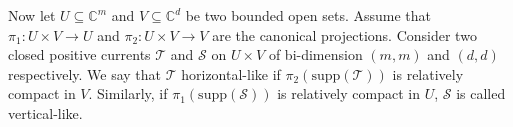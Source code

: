\documentclass[11pt]{amsart}
\theoremstyle{definition}
\newtheorem{theorem}{Theorem}[section]
\newcommand{\lto}{\longrightarrow}
\newcommand{\lmto}{\longmapsto}
\newcommand{\C}{\mathbb{C}}
\newcommand{\sT}{\mathscr{T}}
\newcommand{\sS}{\mathscr{S}}
\newcommand{\supp}[1]{{\mathrm{supp}(#1)}}
\begin{document}
\vskip 2mm
Now let $ U \subseteq \C^m $ and $V \subseteq \C^d$ be two bounded open sets. Assume that $\pi_1 : U \times V \lto U$ and $\pi_2: U\times V \lto V$ are the canonical projections. Consider two closed positive currents $\sT$ and $\sS$ on $U \times V$ of bi-dimension $(m,m)$ and $(d,d)$ respectively. We say that $\sT$ horizontal-like if  $\pi_2(\supp{\sT})$ is relatively compact in $V$. Similarly, if $\pi_1(\supp{\sS})$ is relatively compact in $U$, $\sS$ is called  vertical-like. 


\end{document}
